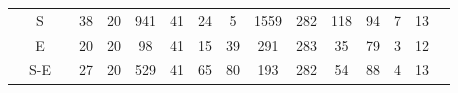 \documentclass[12pt,bibliography=oldstyle,DIV=12,parskip=half-]{scrreprt}
\begin{document}
\begin{table}[h]
\begin{tabular}{@{}ccc@{}SSSSSSSSSSSSS@{}}
    
    \midrule
&{S}  &&  38 & 20&  941 &    41 &    24 &     5 &  1559 &   282 &   118 &    94 &     7 &    13 \\
&{E}  &&  20 & 20&   98 &    41 &    15 &    39 &   291 &   283 &    35 &    79 &     3 &    12 \\
&{S-E}&&  27 & 20&  529 &    41 &    65 &    80 &   193 &   282 &    54 &    88 &     4 &    13 \\

\end{tabular}
\end{table}
\end{document}
